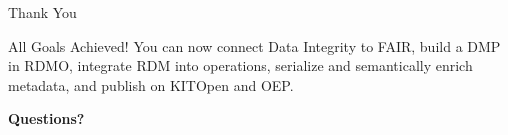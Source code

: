 \documentclass{integrity} %
\begin{document}
\begin{frame}{Thank You}
    \begin{block}{All Goals Achieved!}
        You can now connect Data Integrity to FAIR, build a DMP in RDMO, integrate RDM into operations, serialize and semantically enrich metadata, and publish on KITOpen and OEP.
    \end{block}
    
    \begin{center}
        \vfill
        \textbf{Questions?}
    \end{center}
\end{frame}
\end{document}
